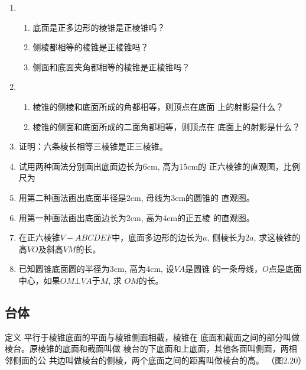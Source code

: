 \begin{ex}
\begin{enumerate}
    \item \begin{enumerate}
        \item 底面是正多边形的棱锥是正棱锥吗？
    \item 侧棱都相等的棱锥是正棱锥吗？
    \item 侧面和底面夹角都相等的棱锥是正棱锥吗？
    \end{enumerate}
  
    \item 
    \begin{enumerate}
      \item 棱锥的侧棱和底面所成的角都相等，则顶点在底面
    上的射影是什么？
    \item 棱锥的侧面和底面所成的二面角都相等，则顶点在
    底面上的射影是什么？  
    \end{enumerate}
    
    \item 证明：六条棱长相等三棱锥是正三棱锥。
    \item 试用两种画法分别画出底面边长为6cm, 高为15cm的
    正六棱锥的直观图，比例尺为
    \item 用第二种画法画出底面半径是2cm, 母线为3cm的圆锥的
    直观图。
    \item 用第一种画法画出底面边长为2cm, 高为4cm的正五棱
    的直观图。
    \item 在正六棱锥$V-ABCDEF$中，底面多边形的边长为$a$,
    侧棱长为$2a$, 求这棱锥的高$VO$及斜高$VM$的长。
    \item 已知圆锥底面圆的半径为3cm, 高为4cm, 设$VA$是圆锥
    的一条母线，$O$点是底面中心，如果$OM\bot VA$于$M$, 求
    $OM$的长。
\end{enumerate}
\end{ex}

\subsection{台体}
\begin{blk}{定义}
    平行于棱锥底面的平面与棱锥侧面相截，棱锥在
底面和截面之间的部分叫做棱台。原棱锥的底面和截面叫做
棱台的下底面和上底面，其他各面叫侧面，两相邻侧面的公
共边叫做棱台的侧棱，两个底面之间的距离叫做棱台的高。
（图2.20）
\end{blk}

